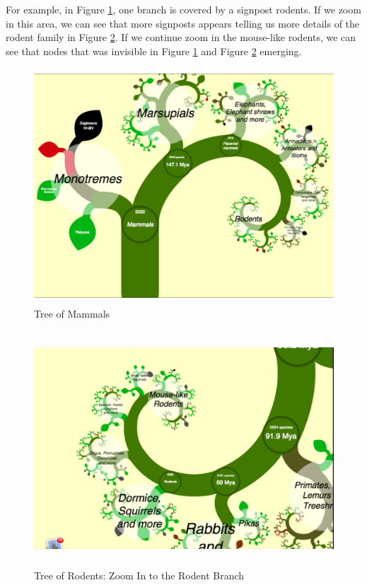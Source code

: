 \documentclass[a4paper,11pt,twoside]{report}
\begin{document}
For example, in Figure \ref{fig:mammal}, one branch is covered by a signpost rodents. If we zoom in this area, we can see that more signposts appears telling us more details of the rodent family in Figure \ref{fig:rodent}. If we continue zoom in the mouse-like rodents, we can see that nodes that was invisible in Figure \ref{fig:mammal} and Figure \ref{fig:rodent} emerging.

\begin{figure}[H]
  \centering
  \includegraphics [width=15cm,height=8.8cm]{Mammal}
  \caption{Tree of Mammals}
  \label{fig:mammal}
\end{figure}

\begin{figure}[H]
  \centering
  \includegraphics [width=15cm,height=8.8cm]{Rodent}
  \caption{Tree of Rodents: Zoom In to the Rodent Branch}
  \label{fig:rodent}
\end{figure}
\end{document}
